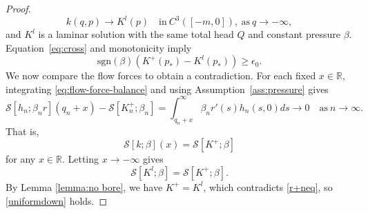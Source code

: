 \documentclass[12pt,letterpaper]{amsart}
\numberwithin{equation}{section}
\def\R{{\mathbb R}}
\def\sgn{\mathrm{sgn}}
\begin{document}
\begin{proof}
	\begin{equation*}
		k(q,p)\to K^l(p)\quad \mathrm{in~} C^3([-m,0]),\mathrm{~as~}q\to-\infty,
	\end{equation*}
	{and $K^l$ is a laminar solution with the same total head $Q$ and constant pressure $\beta$. Equation~\eqref{eq:cross} and monotonicity imply}
	\begin{equation}\label{r+neq}
		\sgn(\beta)(K^+(p_*)-K^l(p_*))\geq \epsilon_0.	\end{equation}
	{We now compare the flow forces to obtain a contradiction. For each fixed $x\in\R$, integrating \eqref{eq:flow-force-balance} and using Assumption~\ref{ass:pressure} gives}
	\begin{equation*}
		\mathscr S[h_n;\beta_n r](q_n+x)-\mathscr{S}[K_n^+;\beta_n]=\int_{q_n+x}^\infty\beta_n r'(s)h_n(s,0)ds\to0\quad\mathrm{as~}n\to\infty.
	\end{equation*}
That is,
\begin{equation*}
	\mathscr{S}[k;\beta](x)=\mathscr{S}[K^+;\beta]
\end{equation*}
	for any $x\in\R$. {Letting $x\to-\infty$ gives}
	\[\mathscr{S}[K^l;\beta]=\mathscr{S}[K^+;\beta].\]
	By Lemma \ref{lemma:no bore}, we have $K^+=K^l$, which contradicts \eqref{r+neq},
	so \eqref{uniformdown} holds.
	

\end{proof}
\end{document}
